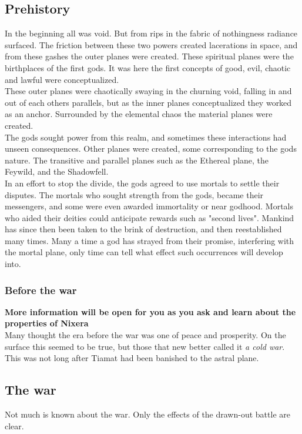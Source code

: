 \documentclass[a4paper]{article}
\begin{document}
\subsection{Prehistory}
In the beginning all was void. But from rips in the fabric of nothingness radiance surfaced. The friction between these two powers created lacerations in space, and from these gashes the outer planes were created. These spiritual planes were the birthplaces of the first gods. It was here the first concepts of good, evil, chaotic and lawful were conceptualized.\\
These outer planes were chaotically swaying in the churning void, falling in and out of each others parallels, but as the inner planes conceptualized they worked as an anchor. Surrounded by the elemental chaos the material planes were created.\\
The gods sought power from this realm, and sometimes these interactions had unseen consequences. Other planes were created, some corresponding to the gods nature. The transitive and parallel planes such as the Ethereal plane, the Feywild, and the Shadowfell.\\
In an effort to stop the divide, the gods agreed to use mortals to settle their disputes. The mortals who sought strength from the gods, became their messengers, and some were even awarded immortality or near godhood. Mortals who aided their deities could anticipate rewards such as "second lives". Mankind has since then been taken to the brink of destruction, and then reestablished many times. Many a time a god has strayed from their promise, interfering with the mortal plane, only time can tell what effect such occurrences will develop into.

\subsubsection{Before the war}
\textbf{More information will be open for you as you ask and learn about the properties of Nixera}
\\
Many thought the era before the war was one of peace and prosperity. On the surface this seemed to be true, but those that new better called it \textit{a cold war}. This was not long after Tiamat had been banished to the astral plane.
\subsection{The war}
Not much is known about the war. Only the effects of the drawn-out battle are clear.  
\end{document}
